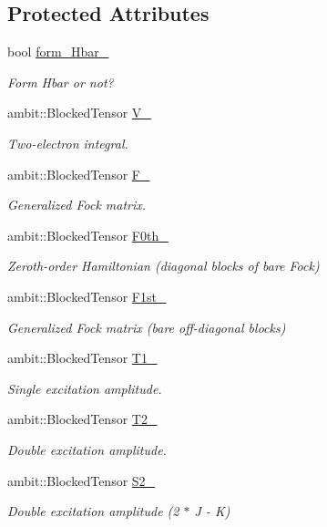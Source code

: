 \subsection*{Protected Attributes}
\begin{DoxyCompactItemize}
\item 
bool \mbox{\hyperlink{classforte_1_1_s_a___d_s_r_g_p_t_abb4303efad33f38641472f787307ca82}{form\+\_\+\+Hbar\+\_\+}}
\begin{DoxyCompactList}\small\item\em Form Hbar or not? \end{DoxyCompactList}\item 
ambit\+::\+Blocked\+Tensor \mbox{\hyperlink{classforte_1_1_s_a___d_s_r_g_p_t_ae5029a168720922a8e9273d74a9cdcfb}{V\+\_\+}}
\begin{DoxyCompactList}\small\item\em Two-\/electron integral. \end{DoxyCompactList}\item 
ambit\+::\+Blocked\+Tensor \mbox{\hyperlink{classforte_1_1_s_a___d_s_r_g_p_t_a5fd2a9df63a3a22b884a8dce5f794c1f}{F\+\_\+}}
\begin{DoxyCompactList}\small\item\em Generalized Fock matrix. \end{DoxyCompactList}\item 
ambit\+::\+Blocked\+Tensor \mbox{\hyperlink{classforte_1_1_s_a___d_s_r_g_p_t_a50b888573c608a75bd4d9733fc17a1da}{F0th\+\_\+}}
\begin{DoxyCompactList}\small\item\em Zeroth-\/order Hamiltonian (diagonal blocks of bare Fock) \end{DoxyCompactList}\item 
ambit\+::\+Blocked\+Tensor \mbox{\hyperlink{classforte_1_1_s_a___d_s_r_g_p_t_a54fd695acbbf03a278adfb5dfc4f29ae}{F1st\+\_\+}}
\begin{DoxyCompactList}\small\item\em Generalized Fock matrix (bare off-\/diagonal blocks) \end{DoxyCompactList}\item 
ambit\+::\+Blocked\+Tensor \mbox{\hyperlink{classforte_1_1_s_a___d_s_r_g_p_t_a6ffbfff2ec9d3a516b000b331e1f8798}{T1\+\_\+}}
\begin{DoxyCompactList}\small\item\em Single excitation amplitude. \end{DoxyCompactList}\item 
ambit\+::\+Blocked\+Tensor \mbox{\hyperlink{classforte_1_1_s_a___d_s_r_g_p_t_a621fbad24dc63013867a08c3f301d11c}{T2\+\_\+}}
\begin{DoxyCompactList}\small\item\em Double excitation amplitude. \end{DoxyCompactList}\item 
ambit\+::\+Blocked\+Tensor \mbox{\hyperlink{classforte_1_1_s_a___d_s_r_g_p_t_a6313f4019ca1434c4e5e56df8c88329a}{S2\+\_\+}}
\begin{DoxyCompactList}\small\item\em Double excitation amplitude (2 $\ast$ J -\/ K) \end{DoxyCompactList}\end{DoxyCompactItemize}

